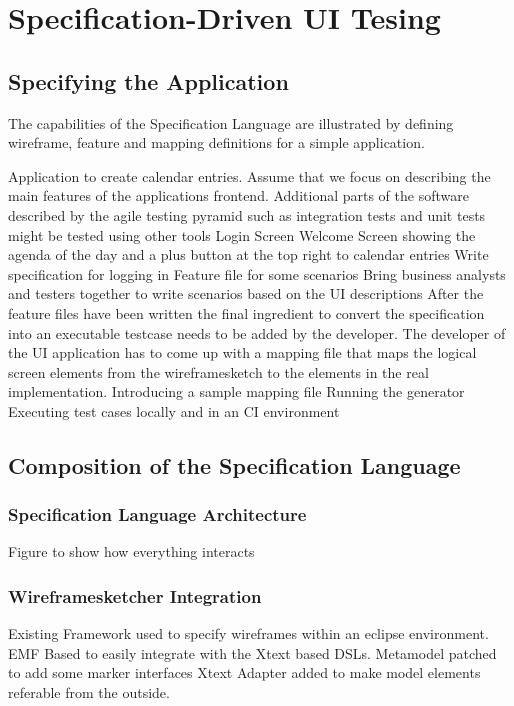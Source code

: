 \documentclass{sig-alternate-05-2015}
\begin{document}
\section{Specification-Driven UI Tesing}\label{sec:SpecificationDrivenUITesting}
\subsection{Specifying the Application}\label{sec:SpecifyingTheApplication} 
The capabilities of the Specification Language are illustrated by defining wireframe, feature and mapping definitions for a simple application.

Application to create calendar entries. Assume that we focus on describing the main features of the applications frontend. Additional parts of the software described by the agile testing pyramid such as integration tests and unit tests might be tested using other tools
Login Screen 
Welcome Screen showing the agenda of the day and a plus button at the top right to calendar entries
Write specification for logging in  Feature file for some scenarios
Bring business analysts and testers together to write scenarios based on the UI descriptions
After the feature files have been written the final ingredient to convert the specification into an executable testcase needs to be added by the developer. The developer of the UI application has to come up with a mapping file that maps the logical screen elements from the wireframesketch to the elements in the real implementation.
Introducing a sample mapping file
Running the generator
Executing test cases locally and in an CI environment

\subsection{Composition of the Specification Language}
\subsubsection{Specification Language Architecture}
Figure to show how everything interacts
\subsubsection{Wireframesketcher Integration}
Existing Framework used to specify wireframes within an eclipse environment.
EMF Based to easily integrate with the Xtext based DSLs.
Metamodel patched to add some marker interfaces
Xtext Adapter added to make model elements referable from the outside.
\end{document}
